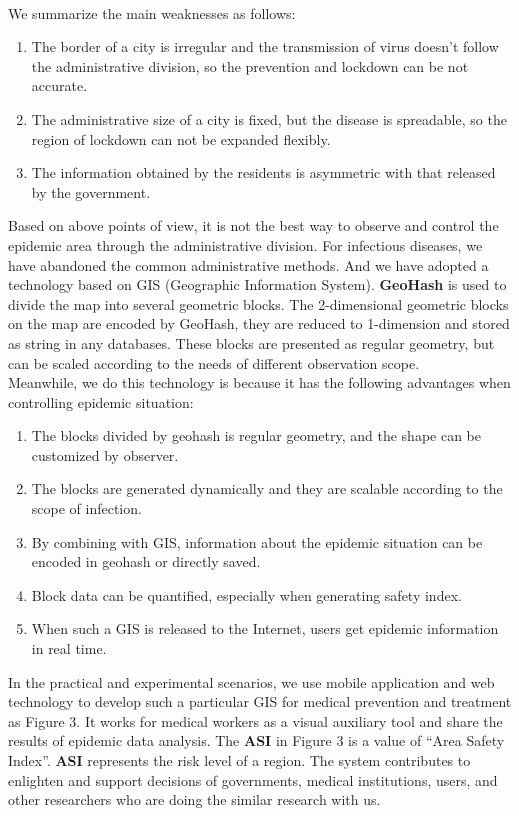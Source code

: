 \documentclass[sigplan,screen]{acmart}
\begin{document}
\\
We summarize the main weaknesses as follows:
\begin{enumerate}
	\item The border of a city is irregular and the transmission of virus doesn't follow the administrative division, so the prevention and lockdown can be not accurate.
	\item The administrative size of a city is fixed, but the disease is spreadable, so the region of lockdown can not be expanded flexibly.
	\item The information obtained by the residents is asymmetric with that released by the government.
\end{enumerate}
Based on above points of view, it is not the best way to observe and control the epidemic area through the administrative division.
For infectious diseases, we have abandoned the common administrative methods. And we have adopted a technology based on GIS (Geographic Information System)\cite{clarke1986advances}. \textbf{GeoHash} is used to divide the map into several geometric blocks. The 2-dimensional geometric blocks on the map are encoded by GeoHash, they are reduced to 1-dimension and stored as string in any databases. These blocks are presented as regular geometry, but can be scaled according to the needs of different observation scope.
\\
Meanwhile, we do this technology is because it has the following advantages when controlling epidemic situation:
\begin{enumerate}
	\item The blocks divided by geohash is regular geometry, and the shape can be customized by observer.
	\item The blocks are generated dynamically and they are scalable according to the scope of infection.
	\item By combining with GIS, information about the epidemic situation can be encoded in geohash or directly saved.
	\item Block data can be quantified, especially when generating safety index.
	\item When such a GIS is released to the Internet, users get epidemic information in real time.
\end{enumerate}
In the practical and experimental scenarios, we use mobile application and web technology to develop such a particular GIS for medical prevention and treatment as Figure 3. It works for medical workers as a visual auxiliary tool and share the results of epidemic data analysis. The \textbf{ASI} in Figure 3 is a value of ``Area Safety Index''. \textbf{ASI} represents the risk level of a region. The system contributes to enlighten and support decisions of governments, medical institutions, users, and other researchers who are doing the similar research with us.
\end{document}
